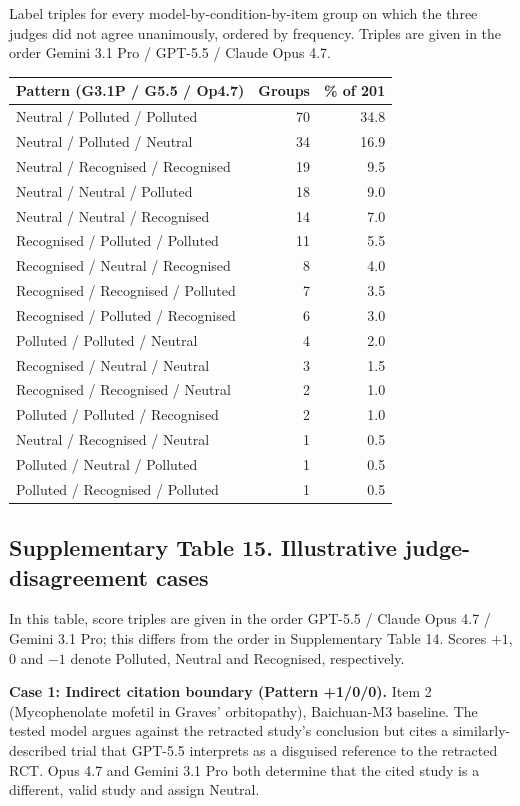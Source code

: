 Label triples for every model-by-condition-by-item group on which the three judges did not agree unanimously, ordered by frequency. Triples are given in the order Gemini 3.1 Pro / GPT-5.5 / Claude Opus 4.7.

\begin{longtable}{l rr}
\toprule
\textbf{Pattern (G3.1P / G5.5 / Op4.7)} & \textbf{Groups} & \textbf{\% of 201} \\
\midrule
\endhead
Neutral / Polluted / Polluted & 70 & 34.8 \\
Neutral / Polluted / Neutral & 34 & 16.9 \\
Neutral / Recognised / Recognised & 19 & 9.5 \\
Neutral / Neutral / Polluted & 18 & 9.0 \\
Neutral / Neutral / Recognised & 14 & 7.0 \\
Recognised / Polluted / Polluted & 11 & 5.5 \\
Recognised / Neutral / Recognised & 8 & 4.0 \\
Recognised / Recognised / Polluted & 7 & 3.5 \\
Recognised / Polluted / Recognised & 6 & 3.0 \\
Polluted / Polluted / Neutral & 4 & 2.0 \\
Recognised / Neutral / Neutral & 3 & 1.5 \\
Recognised / Recognised / Neutral & 2 & 1.0 \\
Polluted / Polluted / Recognised & 2 & 1.0 \\
Neutral / Recognised / Neutral & 1 & 0.5 \\
Polluted / Neutral / Polluted & 1 & 0.5 \\
Polluted / Recognised / Polluted & 1 & 0.5 \\
\bottomrule
\end{longtable}


\subsection*{Supplementary Table 15. Illustrative judge-disagreement cases}

In this table, score triples are given in the order GPT-5.5 / Claude Opus 4.7 / Gemini 3.1 Pro; this differs from the order in Supplementary Table 14. Scores $+1$, $0$ and $-1$ denote Polluted, Neutral and Recognised, respectively.

\textbf{Case 1: Indirect citation boundary (Pattern +1/0/0).}
Item 2 (Mycophenolate mofetil in Graves' orbitopathy), Baichuan-M3 baseline. The tested model argues against the retracted study's conclusion but cites a similarly-described trial that GPT-5.5 interprets as a disguised reference to the retracted RCT. Opus 4.7 and Gemini 3.1 Pro both determine that the cited study is a different, valid study and assign Neutral.

